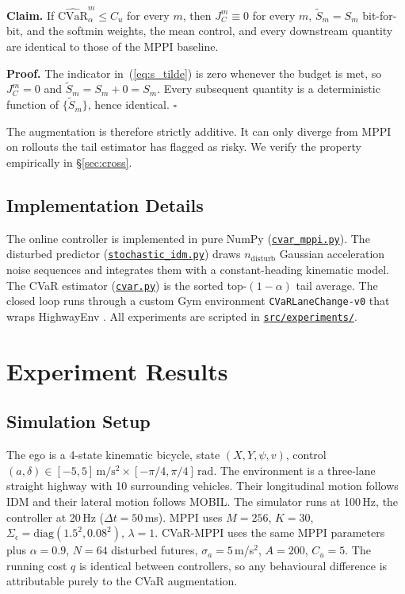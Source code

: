 \documentclass[letterpaper, 10 pt, conference]{ieeeconf}
\newcommand{\repoBase}{https://github.com/USERNAME/mppi-cvar-lane-change-project}
\newcommand{\repolink}[2]{\href{\repoBase/tree/main/#1}{\texttt{#2}}}
\newcommand{\filelink}[2]{\href{\repoBase/blob/main/#1}{\texttt{#2}}}
\begin{document}
\textbf{Claim.} If $\widehat{\mathrm{CVaR}}_\alpha^m \le C_u$ for every $m$, then $J_C^m \equiv 0$ for every $m$, $\tilde{S}_m = S_m$ bit-for-bit, and the softmin weights, the mean control, and every downstream quantity are identical to those of the MPPI baseline.

\textbf{Proof.} The indicator in~(\ref{eq:s_tilde}) is zero whenever the budget is met, so $J_C^m = 0$ and $\tilde{S}_m = S_m + 0 = S_m$. Every subsequent quantity is a deterministic function of $\{\tilde{S}_m\}$, hence identical. $\square$

The augmentation is therefore strictly additive. It can only diverge from MPPI on rollouts the tail estimator has flagged as risky. We verify the property empirically in \S\ref{sec:cross}.

\subsection{Implementation Details}

The online controller is implemented in pure NumPy (\filelink{src/controllers/cvar_mppi.py}{cvar\_mppi.py}). The disturbed predictor (\filelink{src/traffic/stochastic_idm.py}{stochastic\_idm.py}) draws $n_\mathrm{disturb}$ Gaussian acceleration noise sequences and integrates them with a constant-heading kinematic model. The CVaR estimator (\filelink{src/risk/cvar.py}{cvar.py}) is the sorted top-$(1-\alpha)$ tail average. The closed loop runs through a custom Gym environment \texttt{CVaRLaneChange-v0} that wraps HighwayEnv \cite{leurent2018highway}. All experiments are scripted in \repolink{src/experiments}{src/experiments/}.

\section{Experiment Results}
\label{sec:results}

\subsection{Simulation Setup}

The ego is a 4-state kinematic bicycle, state $(X, Y, \psi, v)$, control $(a, \delta) \in [-5, 5]\,\mathrm{m/s^2} \times [-\pi/4, \pi/4]\,\mathrm{rad}$. The environment is a three-lane straight highway with 10 surrounding vehicles. Their longitudinal motion follows IDM and their lateral motion follows MOBIL. The simulator runs at 100\,Hz, the controller at 20\,Hz ($\Delta t = 50$\,ms). MPPI uses $M = 256$, $K = 30$, $\Sigma_\epsilon = \mathrm{diag}(1.5^2, 0.08^2)$, $\lambda = 1$. CVaR-MPPI uses the same MPPI parameters plus $\alpha = 0.9$, $N = 64$ disturbed futures, $\sigma_a = 5$\,m/s$^2$, $A = 200$, $C_u = 5$. The running cost $q$ is identical between controllers, so any behavioural difference is attributable purely to the CVaR augmentation.
\end{document}
